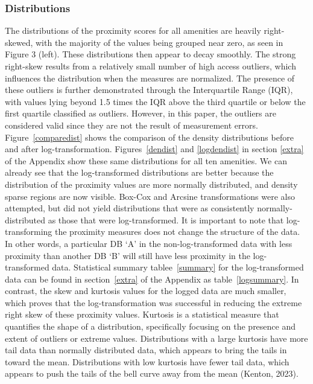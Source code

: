\documentclass[11pt, a4paper]{article}
\begin{document}
\subsubsection{Distributions}



The distributions of the proximity scores for all amenities are heavily right-skewed, with the majority of the values being grouped near zero, as seen in Figure 3 (left). These distributions then appear to decay smoothly. The strong right-skew results from a relatively small number of high access outliers, which influences the distribution when the measures are normalized. The presence of these outliers is further demonstrated through the Interquartile Range (IQR), with values lying beyond 1.5 times the IQR above the third quartile or below the first quartile classified as outliers. However, in this paper, the outliers are considered valid since they are not the result of measurement errors. Figure~\ref{comparedist} shows the comparison of the density distributions before and after log-transformation. Figures~\ref{dendist} and \ref{logdendist} in section \ref{extra} of the Appendix show these same distributions for all ten amenities. We can already see that the log-transformed distributions are better because the distribution of the proximity values are more normally distributed, and density sparse regions are now visible. Box-Cox and Arcsine transformations were also attempted, but did not yield distributions that were as consistently normally-distributed as those that were log-transformed. It is important to note that log-transforming the proximity measures does not change the structure of the data. In other words, a particular DB `A' in the non-log-transformed data with less proximity than another DB `B' will still have less proximity in the log-transformed data. Statistical summary tablee~\ref{summary} for the log-transformed data can be found in section~\ref{extra} of the Appendix as table~\ref{logsummary}. In contrast, the skew and kurtosis values for the logged data are much smaller, which proves that the log-transformation was successful in reducing the extreme right skew of these proximity values. Kurtosis is a statistical measure that quantifies the shape of a distribution, specifically focusing on the presence and extent of outliers or extreme values. Distributions with a large kurtosis have more tail data than normally distributed data, which appears to bring the tails in toward the mean. Distributions with low kurtosis have fewer tail data, which appears to push the tails of the bell curve away from the mean (Kenton, 2023).
\end{document}
